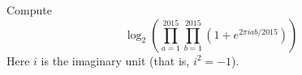 Compute \[\log_2\left(\prod_{a=1}^{2015}\prod_{b=1}^{2015}\left(1+e^{2\pi iab/2015}\right)\right)\]Here $i$ is the imaginary unit (that is, $i^2=-1$).